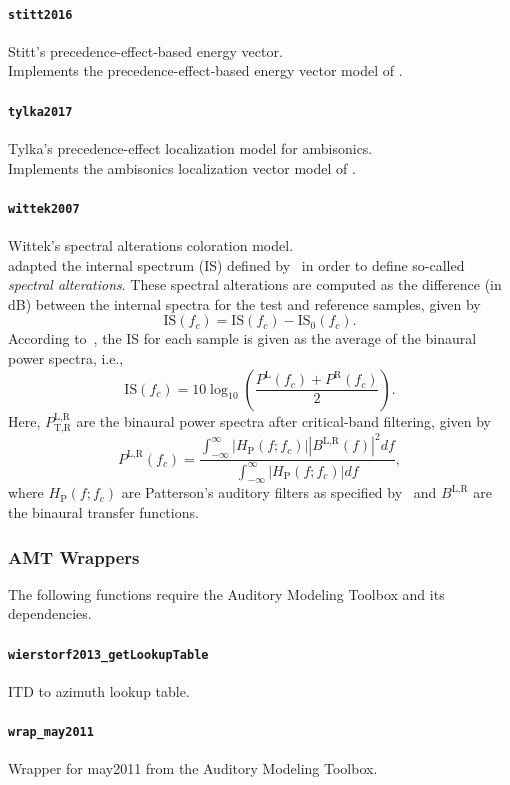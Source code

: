\documentclass[11pt, oneside]{article}
\newcommand{\function}[1]{\paragraph*{\texttt{#1}}}
\begin{document}
\function{stitt2016} Stitt's precedence-effect-based energy vector. \\
Implements the precedence-effect-based energy vector model of \citet{Stitt2016}.

\function{tylka2017} Tylka's precedence-effect localization model for ambisonics. \\
Implements the ambisonics localization vector model of \citet{TylkaChoueiri2017a}.

\function{wittek2007} Wittek's spectral alterations coloration model. \\
\citet{Wittek2007} adapted the internal spectrum (IS) defined by~\citet[chapter~5]{Salomons1995PhD} in order to define so-called \textit{spectral alterations}.
These spectral alterations are computed as the difference (in dB) between the internal spectra for the test and reference samples, given by
\begin{equation}
\text{IS}(f_c) = \text{IS}(f_c) - \text{IS}_0(f_c).
\end{equation}
According to~\citet[section~3.2.5]{Wittek2007}, the IS for each sample is given as the average of the binaural power spectra, i.e.,
\begin{equation}
\text{IS}(f_c) = 10 \log_{10} \left( \frac{P^\text{L}(f_c) + P^\text{R}(f_c)}{2} \right).
\end{equation}
Here, $P_{\text{T},\text{R}}^{\text{L},\text{R}}$ are the binaural power spectra after critical-band filtering, given by~\citep[Eq.~(5.12)]{Salomons1995PhD}
\begin{equation}
P^{\text{L},\text{R}}(f_c) = \frac{\displaystyle \int_{-\infty}^\infty |H_\text{P}(f;f_c)| |B^{\text{L},\text{R}}(f)|^2 df}{\displaystyle \int_{-\infty}^\infty |H_\text{P}(f;f_c)| df},
\end{equation}
where $H_\text{P}(f;f_c)$ are Patterson's auditory filters as specified by~\citet[Eq.~(5.9)]{Salomons1995PhD}
and $B^{\text{L},\text{R}}$ are the binaural transfer functions.

\subsubsection{AMT Wrappers}

The following functions require the Auditory Modeling Toolbox and its dependencies.

\function{wierstorf2013\_getLookupTable} ITD to azimuth lookup table. \\

\function{wrap\_may2011} Wrapper for may2011 from the Auditory Modeling Toolbox. \\
\end{document}
